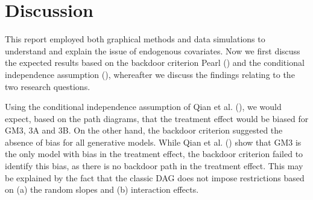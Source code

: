 \documentclass[
  11pt,
  a4paper,
]{article}
\begin{document}
\begin{figure}[H]
\begin{minipage}{0.50\linewidth}
{}

\end{minipage}%
%
\begin{minipage}{0.50\linewidth}



\end{minipage}%

\end{figure}%

\section{Discussion}\label{discussion}

This report employed both graphical methods and data simulations to
understand and explain the issue of endogenous covariates. Now we first
discuss the expected results based on the backdoor criterion Pearl
() and the conditional independence
assumption (), whereafter we
discuss the findings relating to the two research questions.

Using the conditional independence assumption of Qian et al.
(), we would expect, based on the path
diagrams, that the treatment effect would be biased for GM3, 3A and 3B.
On the other hand, the backdoor criterion suggested the absence of bias
for all generative models. While Qian et al.
() show that GM3 is the only model with
bias in the treatment effect, the backdoor criterion failed to identify
this bias, as there is no backdoor path in the treatment effect. This
may be explained by the fact that the classic DAG does not impose
restrictions based on (a) the random slopes and (b) interaction effects.
\end{document}
